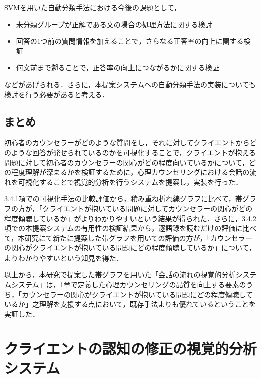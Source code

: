 \documentclass[shuuron]{kuee}
\begin{document}
SVMを用いた自動分類手法における今後の課題として，
\begin{itemize}
  \item 未分類グループが正解である文の場合の処理方法に関する検討
  \item 回答の1つ前の質問情報を加えることで，さらなる正答率の向上に関する検証
  \item 何文前まで遡ることで，正答率の向上につながるかに関する検証
\end{itemize}
などがあげられる．さらに，本提案システムへの自動分類手法の実装についても検討を行う必要があると考える．


\section{まとめ}


初心者のカウンセラーがどのような質問をし，それに対してクライエントからどのような回答が発せられているのかを可視化することで，クライエントが抱える問題に対して初心者のカウンセラーの関心がどの程度向いているかについて，どの程度理解が深まるかを検証するために，心理カウンセリングにおける会話の流れを可視化することで視覚的分析を行うシステムを提案し，実装を行った．


3.4.1項での可視化手法の比較評価から，積み重ね折れ線グラフに比べて，帯グラフの方が，「クライエントが抱いている問題に対してカウンセラーの関心がどの程度傾聴しているか」がよりわかりやすいという結果が得られた．さらに，3.4.2項での本提案システムの有用性の検証結果から，逐語録を読むだけの評価に比べて，本研究にて新たに提案した帯グラフを用いての評価の方が，「カウンセラーの関心がクライエントが抱いている問題にどの程度傾聴しているか」について，よりわかりやすいという知見を得た．

以上から，本研究で提案した帯グラフを用いた「会話の流れの視覚的分析システムシステム」は，1章で定義した心理カウンセリングの品質を向上する要素のうち，「カウンセラーの関心がクライエントが抱いている問題にどの程度傾聴しているか」之理解を支援する点において，既存手法よりも優れているということを実証した．




\chapter{クライエントの認知の修正の視覚的分析システム}
\end{document}
